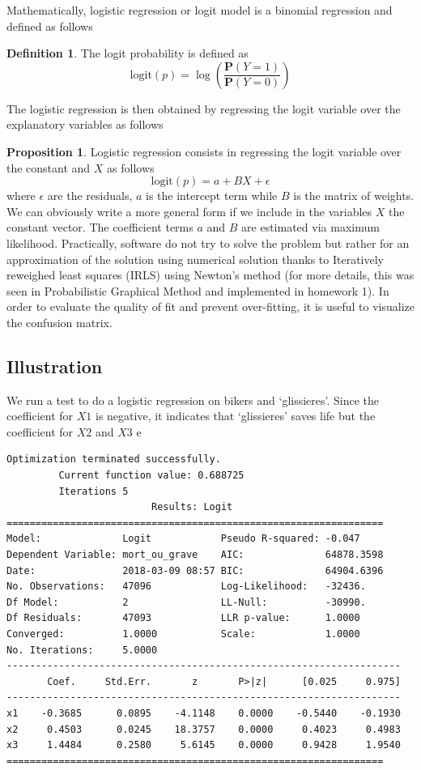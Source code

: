 \documentclass[a4paper]{article}
\theoremstyle{definition}
\theoremstyle{proposition}
\newtheorem{definition}{Definition}[section]
\newtheorem{proposition}{Proposition}[section]
\begin{document}
Mathematically, logistic regression or logit model is a binomial regression and defined as follows
\begin{definition}
The logit probability is defined as
\[
\text{logit}(p)= \log\left( \frac{ \mathbf{P}(Y=1)} { \mathbf{P}(Y=0)} \right)
\] 
\end{definition}

The logistic regression is then obtained by regressing the logit variable over the explanatory variables as follows
\begin{proposition}
Logistic regression consists in regressing the logit variable over the constant and $X$ as follows
\[
\text{logit}(p)= a + B X + \epsilon
\]
where $\epsilon$ are the residuals, $a$ is the intercept term while $B$ is the matrix of weights. We can obviously write a more general form if we include in the variables $X$ the constant vector.
The coefficient terms $a$ and $B$ are estimated via maximum likelihood. Practically, software do not try to solve the problem but rather for an approximation of the solution using numerical solution thanks to Iteratively reweighed least squares (IRLS) using Newton's method (for more details, this was seen in Probabilistic Graphical Method and implemented in homework 1). In order to evaluate the quality of fit and prevent over-fitting, it is useful to visualize the confusion matrix.
\end{proposition}


\subsection{Illustration}
We run a test to do a logistic regression on bikers and `glissieres'. Since the coefficient for $X1$ is negative, it indicates that `glissieres' saves life but the coefficient for $X2$ and $X3$ e
\begin{verbatim}
Optimization terminated successfully.
         Current function value: 0.688725
         Iterations 5
                         Results: Logit
=================================================================
Model:              Logit            Pseudo R-squared: -0.047    
Dependent Variable: mort_ou_grave    AIC:              64878.3598
Date:               2018-03-09 08:57 BIC:              64904.6396
No. Observations:   47096            Log-Likelihood:   -32436.   
Df Model:           2                LL-Null:          -30990.   
Df Residuals:       47093            LLR p-value:      1.0000    
Converged:          1.0000           Scale:            1.0000    
No. Iterations:     5.0000                                       
--------------------------------------------------------------------
       Coef.     Std.Err.       z       P>|z|      [0.025     0.975]
--------------------------------------------------------------------
x1    -0.3685      0.0895    -4.1148    0.0000    -0.5440    -0.1930
x2     0.4503      0.0245    18.3757    0.0000     0.4023     0.4983
x3     1.4484      0.2580     5.6145    0.0000     0.9428     1.9540
=================================================================

\end{verbatim}
\end{document}
